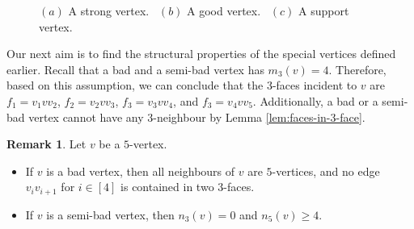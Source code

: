 \documentclass[12pt, reqno]{amsart}
\theoremstyle{plain}
\theoremstyle{definition}
\newtheorem{remark}[equation]{Remark}
\numberwithin{equation}{section}
\begin{document}
\begin{figure}[htb]
{  }
\caption{$(a)$ A strong vertex. \ $(b)$ A good vertex. \ $(c)$ A support vertex.}
\label{fig:others}
\end{figure}


Our next aim is to find the structural properties of the special vertices defined earlier. Recall that a bad and a semi-bad vertex has $m_3(v)=4$. Therefore, based on this assumption, we can conclude that the $3$-faces incident to $v$ are $f_1=v_1vv_2$, $f_2=v_2vv_3$, $f_3=v_3vv_4$, and $f_3=v_4vv_5$. Additionally, a bad or a semi-bad vertex cannot have any $3$-neighbour by Lemma \ref{lem:faces-in-3-face}.




\begin{remark}\label{rem:specil vertices} 
Let $v$ be a $5$-vertex.
\begin{itemize}
\item[$(a)$] If $v$ is a bad vertex, then all neighbours of $v$ are $5$-vertices, and no edge $v_iv_{i+1}$ for $i\in [4]$ is contained in two $3$-faces.

\item[$(b)$] If $v$ is a semi-bad vertex, then $n_3(v)=0$ and $n_5(v)\geq 4$. %
%
%
\end{itemize}
\end{remark}
\end{document}
